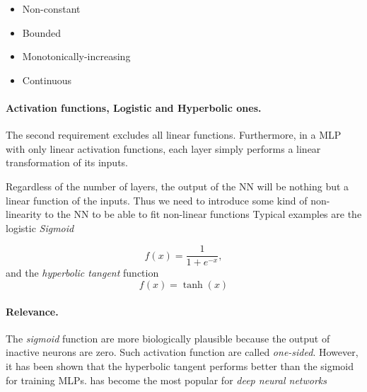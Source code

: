 \documentclass[%
oneside,                 %
final,                   %
10pt]{article}
\begin{document}
\begin{itemize}
  \item Non-constant

  \item Bounded

  \item Monotonically-increasing

  \item Continuous
\end{itemize}

\noindent
\paragraph{Activation functions, Logistic and Hyperbolic ones.}
The second requirement excludes all linear functions. Furthermore, in
a MLP with only linear activation functions, each layer simply
performs a linear transformation of its inputs.

Regardless of the number of layers, the output of the NN will be
nothing but a linear function of the inputs. Thus we need to introduce
some kind of non-linearity to the NN to be able to fit non-linear
functions Typical examples are the logistic \emph{Sigmoid}

\[
 f(x) = \frac{1}{1 + e^{-x}},
\]
and the \emph{hyperbolic tangent} function
\[
 f(x) = \tanh(x)
\]

\paragraph{Relevance.}
The \emph{sigmoid} function are more biologically plausible because the
output of inactive neurons are zero. Such activation function are
called \emph{one-sided}. However, it has been shown that the hyperbolic
tangent performs better than the sigmoid for training MLPs.  has
become the most popular for \emph{deep neural networks}
\end{document}
